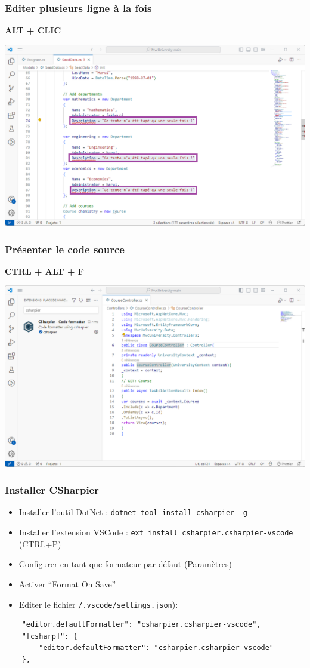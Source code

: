 \begin{frame}
    \frametitle{Editer plusieurs ligne à la fois}
    \centering
    \Huge\textbf{ALT + CLIC}

    \includegraphics[height=0.4\linewidth]{figures/environnement/multi-edition}
\end{frame}

\begin{frame}
    \frametitle{Présenter le code source}
    \centering
    \Huge
    \textbf{CTRL + ALT + F}

    \includegraphics[height=0.4\linewidth]{figures/environnement/mise-en-forme}
\end{frame}

\begin{frame}[fragile]
    \frametitle{Installer CSharpier}
    \centering
    \begin{itemize}
        \item Installer l'outil DotNet : \texttt{dotnet tool install csharpier -g}
        \item Installer l'extension VSCode : \texttt{ext install csharpier.csharpier-vscode} (CTRL+P)
        \item Configurer en tant que formateur par défaut (Paramètres)
        \item Activer \enquote{Format On Save}
        \item Editer le fichier \texttt{/.vscode/settings.json}):
    \end{itemize}

    \begin{verbatim}
    "editor.defaultFormatter": "csharpier.csharpier-vscode",
    "[csharp]": {
        "editor.defaultFormatter": "csharpier.csharpier-vscode"
    },
    \end{verbatim}
\end{frame}


